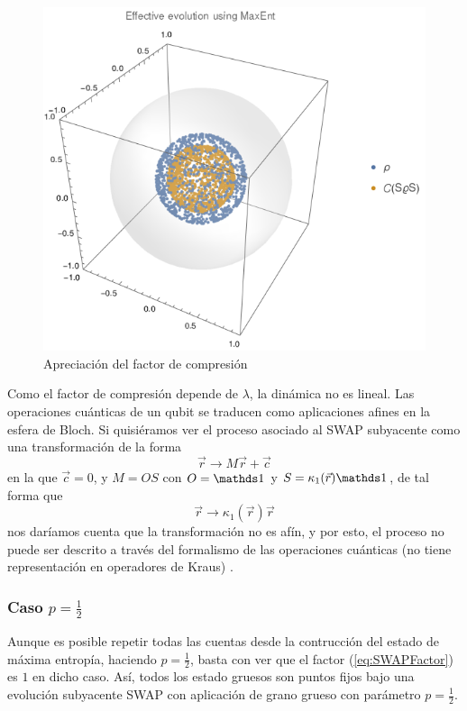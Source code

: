 \begin{figure}[h!]
\centering
\includegraphics[width=0.6\linewidth]{maxent/figures/MaxEnt_SWAP_t0vst1_n=5000_z=0.5_p=0.3_beta=150_delta=0.6.png}
\caption{Apreciación del factor de compresión }
\label{fig:factornnum}
\end{figure}

Como el factor de compresión depende de $\lambda$, la dinámica no es lineal. Las operaciones cuánticas de un qubit se traducen como aplicaciones afines en la esfera de Bloch. Si quisiéramos ver el proceso asociado al \textsc{SWAP} subyacente como una transformación de la forma
\begin{equation*}
  \vec{r}\rightarrow M\vec{r}+\vec{c}
\end{equation*}
en la que $\vec{c}=0$, y $M=OS$ con $O=\Id$ y $S=\kappa_{1}(\vec{r})\Id$, de tal forma que
\begin{equation*}
  \vec{r}\rightarrow \kappa_{1}(\vec{r})\vec{r}
\end{equation*}
nos daríamos cuenta que la transformación no es afín, y por esto, el proceso no puede ser descrito a través del formalismo de las operaciones cuánticas (no tiene representación en operadores de Kraus) \cite{Chuang}.
\subsubsection{Caso $p=\frac{1}{2}$}

Aunque es posible repetir todas las cuentas desde la contrucción del estado de máxima entropía, haciendo $p=\frac{1}{2}$, basta con ver que el factor (\eqref{eq:SWAPFactor}) es $1$ en dicho caso. Así, todos los estado gruesos son puntos fijos bajo una evolución subyacente SWAP con aplicación de grano grueso con parámetro $p=\frac{1}{2}$.

